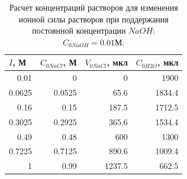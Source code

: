 \documentclass[a4paper,12pt]{article}
\begin{document}
\begin{table}[h!]
\centering
\begin{tabular}{|r|r|r|r|}
\hline
\multicolumn{1}{|l|}{$I$, М} & \multicolumn{1}{l|}{$C_{0NaCl}$, М} & \multicolumn{1}{l|}{$V_{0NaCl}$, мкл} & \multicolumn{1}{l|}{$C_{0H2O}$, мкл} \\ \hline
0.01                         & 0                                   & 0                                     & 1900                                 \\ \hline
0.0625                       & 0.0525                              & 65.6                                  & 1834.4                               \\ \hline
0.16                         & 0.15                                & 187.5                                 & 1712.5                               \\ \hline
0.3025                       & 0.2925                              & 365.6                                 & 1534.4                               \\ \hline
0.49                         & 0.48                                & 600                                   & 1300                                 \\ \hline
0.7225                       & 0.7125                              & 890.6                                 & 1009.4                               \\ \hline
1                            & 0.99                                & 1237.5                                & 662.5                                \\ \hline
\end{tabular}
\caption{Расчет концентраций растворов для изменения ионной силы растворов при поддержания постоянной концентрации $NaOH$: $C_{0NaOH} = 0.01 М$.}
\label{tab:my-table}
\end{table}
\end{document}
